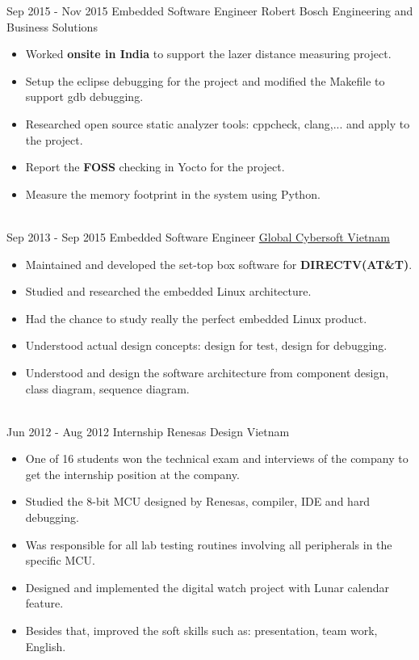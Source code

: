 \documentclass[letterpaper]{twentysecondcv} %
\begin{document}
        \begin{twenty}
	\twentyitem
    	{Sep 2015 -}
		{Nov 2015}
        {Embedded Software Engineer}
        {{Robert Bosch Engineering and Business Solutions}}
        {}
        {
        {\begin{itemize}
        \item Worked \textbf{onsite in India} to support the lazer distance measuring project.
        \item Setup the eclipse debugging for the project and modified the Makefile to support gdb
        debugging.
        \item Researched open source static analyzer tools: cppcheck, clang,... and apply to the project.
        \item Report the \textbf{FOSS} checking in Yocto for the project.
        \item Measure the memory footprint in the system using Python.
	    \end{itemize}}
        }
\\
	\twentyitem
	{Sep 2013 -}
	{Sep 2015}
	{Embedded Software Engineer}
	{\href{http://www.globalcybersoft.com/en}{Global Cybersoft Vietnam}}
	{}
	{
		{\begin{itemize}
				\item Maintained and developed the set-top box software for \textbf{DIRECTV(AT\&T)}.
				\item Studied and researched the embedded Linux architecture.
				\item Had the chance to study really the perfect embedded Linux product.
				\item Understood actual design concepts: design for test, design for debugging.
				\item Understood and design the software architecture from component design, class diagram, sequence diagram.
		\end{itemize}}
	}
	\\
	\twentyitem
	{Jun 2012 -}
	{Aug 2012}
	{Internship}
	{{Renesas Design Vietnam}}
	{}
	{
		\begin{itemize}
			\item One of 16 students won the technical exam and interviews of the company to get the internship position at the company.
			\item Studied the 8-bit MCU designed by Renesas, compiler, IDE and hard debugging.
			\item Was responsible for all lab testing routines involving all peripherals in the specific MCU.
			\item Designed and implemented the digital watch project with Lunar calendar feature.
			\item Besides that, improved the soft skills such as: presentation, team work, English.
		\end{itemize}
	}
\end{twenty}
	    \\   
	    \newpage
\end{document}
